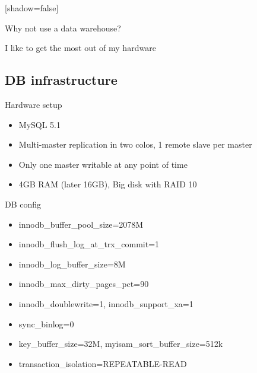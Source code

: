 \documentclass{beamer}
\begin{document}
[shadow=false]
\begin{frame}{}
  \begin{block}{}
  \begin{center}
  Why not use a data warehouse?
  \end{center}
  \end{block}
\end{frame}

\begin{frame}{}
  \begin{block}{}
  \begin{center}
  I like to get the most out of my hardware
  \end{center}
  \end{block}
\end{frame}

\subsection{DB infrastructure}
\begin{frame}{Hardware setup}
  \begin{itemize}
  \item MySQL 5.1
  \item Multi-master replication in two colos, 1 remote slave per master
  \item Only one master writable at any point of time
  \item 4GB RAM (later 16GB), Big disk with RAID 10
  \end{itemize}
\end{frame}

\begin{frame}{DB config}
  \begin{itemize}
  \item innodb\_buffer\_pool\_size=2078M
  \item innodb\_flush\_log\_at\_trx\_commit=1
  \item innodb\_log\_buffer\_size=8M
  \item innodb\_max\_dirty\_pages\_pct=90
  \item innodb\_doublewrite=1, innodb\_support\_xa=1
  \item sync\_binlog=0
  \item key\_buffer\_size=32M, myisam\_sort\_buffer\_size=512k
  \item transaction\_isolation=REPEATABLE-READ
  \end{itemize}
\end{frame}
\end{document}
